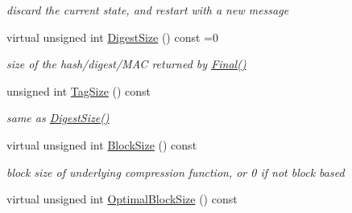 \begin{DoxyCompactItemize}
\begin{DoxyCompactList}\small\item\em discard the current state, and restart with a new message \item\end{DoxyCompactList}\item 
\hypertarget{class_hash_transformation_a9f42cc280bac76b884ad12615c0dabb5}{
virtual unsigned int \hyperlink{class_hash_transformation_a9f42cc280bac76b884ad12615c0dabb5}{DigestSize} () const =0}
\label{class_hash_transformation_a9f42cc280bac76b884ad12615c0dabb5}

\begin{DoxyCompactList}\small\item\em size of the hash/digest/MAC returned by \hyperlink{class_hash_transformation_aa0b8c7a110d8968268fd02ec32b9a8e8}{Final()} \item\end{DoxyCompactList}\item 
\hypertarget{class_hash_transformation_a5e847d65a38ec354de1b28cc4bc66a81}{
unsigned int \hyperlink{class_hash_transformation_a5e847d65a38ec354de1b28cc4bc66a81}{TagSize} () const }
\label{class_hash_transformation_a5e847d65a38ec354de1b28cc4bc66a81}

\begin{DoxyCompactList}\small\item\em same as \hyperlink{class_hash_transformation_a9f42cc280bac76b884ad12615c0dabb5}{DigestSize()} \item\end{DoxyCompactList}\item 
\hypertarget{class_hash_transformation_ab5507c62376f6bea41d53ae9544d0ff0}{
virtual unsigned int \hyperlink{class_hash_transformation_ab5507c62376f6bea41d53ae9544d0ff0}{BlockSize} () const }
\label{class_hash_transformation_ab5507c62376f6bea41d53ae9544d0ff0}

\begin{DoxyCompactList}\small\item\em block size of underlying compression function, or 0 if not block based \item\end{DoxyCompactList}\item 
\hypertarget{class_hash_transformation_a981fce3f7d06c1f4ab2da853a1cf429d}{
virtual unsigned int \hyperlink{class_hash_transformation_a981fce3f7d06c1f4ab2da853a1cf429d}{OptimalBlockSize} () const }
\label{class_hash_transformation_a981fce3f7d06c1f4ab2da853a1cf429d}


\end{DoxyCompactItemize}
